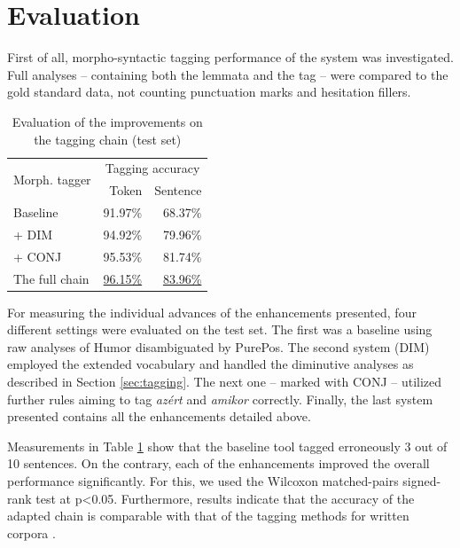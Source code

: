 \section{Evaluation}

First of all, morpho-syntactic tagging performance of the system was investigated. 
Full analyses -- containing both the lemmata and the tag -- were compared to the gold standard data, not counting punctuation marks and hesitation fillers.

\begin{table}[H]
\centering
\caption{Evaluation of the improvements on the tagging chain (test set)}
\label{tab:eval_tag}
\begin{tabular}{ l r r} 
\hline
\multicolumn{1}{l}{\multirow{2}{*}{Morph. tagger}} & \multicolumn{2}{c}{\hspace{0.8cm} Tagging accuracy} \\
& Token &  Sentence \\
\hline
Baseline &  \hspace{0.8cm} 91.97\%  & \hspace{0.8cm} 68.37\% \\
\hspace{0.2cm} + DIM &  94.92\% & 79.96\% \\
\hspace{0.2cm} + CONJ & 95.53\% & 81.74\% \\
The full chain & \underline{96.15\%} & \underline{83.96\%} \\

\hline
\end{tabular}
\end{table}

For measuring the individual advances of the enhancements presented, four different settings were evaluated on the test set. 
The first was a baseline using raw analyses of Humor disambiguated by PurePos. 
The second system (DIM) employed the extended vocabulary and handled the diminutive analyses as described in Section \ref{sec:tagging}. 
The next one -- marked with CONJ -- utilized further rules aiming to tag \textit{azért} and \textit{amikor} correctly. 
Finally, the last system presented contains all the enhancements detailed above.

Measurements in Table \ref{tab:eval_tag} show that the baseline tool tagged erroneously 3 out of 10 sentences. 
On the contrary, each of the enhancements improved the overall performance significantly.
For this, we used the Wilcoxon matched-pairs signed-rank test at p<0.05. 
Furthermore, results indicate that the accuracy of the adapted chain is comparable with that of the tagging methods for written corpora \cite{zsibrata2013magyarlanc}. 

